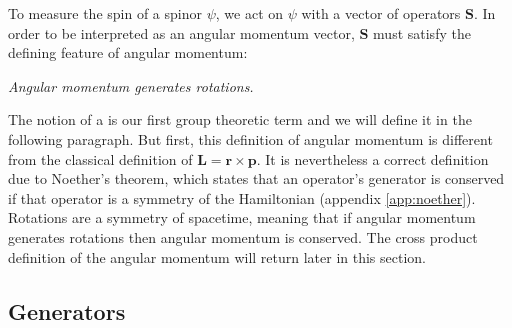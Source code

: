 To measure the spin of a spinor $\psi$, we act on $\psi$ with a vector of operators $\bm S$. In order to be interpreted as an angular momentum vector, $\bm S$ must satisfy the defining feature of angular momentum: 

\begin{center}
  \textit{Angular momentum generates rotations.}
\end{center}

The notion of a  is our first group theoretic term and we will define it in the following paragraph. But first, this definition of angular momentum is different from the classical definition of $\bm L = \bm r \times \bm p$. It is nevertheless a correct definition due to Noether's theorem, which states that an operator's generator is conserved if that operator is a symmetry of the Hamiltonian (appendix \ref{app:noether}). Rotations are a symmetry of spacetime, meaning that if angular momentum generates rotations then angular momentum is conserved. The cross product definition of the angular momentum will return later in this section.

\subsection{Generators}

